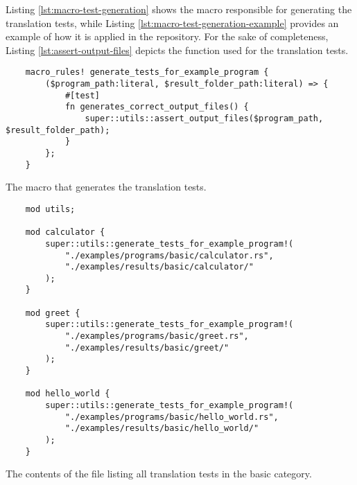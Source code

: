 Listing \ref{lst:macro-test-generation} shows the macro responsible for generating the translation tests,
while Listing \ref{lst:macro-test-generation-example} provides an example of how it is applied
in the repository. For the sake of completeness, Listing \ref{lst:assert-output-files}
depicts the function used for the translation tests.

\begin{listing}[!htbp]
    \begin{verbatim}
    macro_rules! generate_tests_for_example_program {
        ($program_path:literal, $result_folder_path:literal) => {
            #[test]
            fn generates_correct_output_files() {
                super::utils::assert_output_files($program_path, $result_folder_path);
            }
        };
    }        
    \end{verbatim}
    \caption{The macro that generates the translation tests.}
    \label{lst:macro-test-generation}
\end{listing}


\begin{listing}[!htbp]
    \begin{verbatim}
    mod utils;
    
    mod calculator {
        super::utils::generate_tests_for_example_program!(
            "./examples/programs/basic/calculator.rs",
            "./examples/results/basic/calculator/"
        );
    }
    
    mod greet {
        super::utils::generate_tests_for_example_program!(
            "./examples/programs/basic/greet.rs",
            "./examples/results/basic/greet/"
        );
    }
    
    mod hello_world {
        super::utils::generate_tests_for_example_program!(
            "./examples/programs/basic/hello_world.rs",
            "./examples/results/basic/hello_world/"
        );
    }    
    \end{verbatim}
    \caption{The contents of the file  listing all translation tests in the basic category.}
    \label{lst:macro-test-generation-example}
\end{listing}

